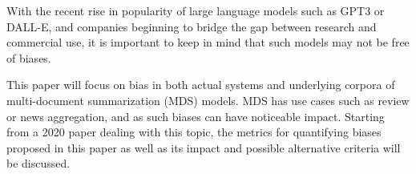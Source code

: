 \documentclass[../main.tex]{subfiles}
\begin{document}
With the recent rise in popularity of large language models such as GPT3 or DALL-E,
and companies beginning to bridge the gap between research and commercial use,
it is important to keep in mind that such models may not be free of biases.



This paper will focus on bias in both actual systems and underlying corpora of multi-document summarization (MDS) models.
MDS has use cases such as review or news aggregation, and as such biases can have noticeable impact.\cite{dey-etal-2020-corpora}
Starting from a 2020 paper\cite{dey-etal-2020-corpora} dealing with this topic,
the metrics for quantifying biases proposed in this paper as well as its impact and possible alternative criteria will be discussed.
\end{document}
